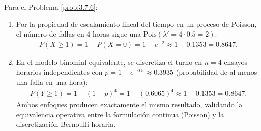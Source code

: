 \begin{solucion}
	\label{sol:3.7.6}
	Para el Problema \ref{prob:3.7.6}:
	\begin{enumerate}
		\item Por la propiedad de escalamiento lineal del tiempo en un proceso de Poisson, el número de fallas en $4$ horas sigue una $\text{Pois}(\lambda' = 4 \cdot 0.5 = 2)$:
		\begin{align*}
			P(X \ge 1) = 1 - P(X = 0) = 1 - e^{-2} \approx 1 - 0.1353 = 0.8647.
		\end{align*}
		\item En el modelo binomial equivalente, se discretiza el turno en $n = 4$ ensayos horarios independientes con $p = 1 - e^{-0.5} \approx 0.3935$ (probabilidad de al menos una falla en una hora):
		\begin{align*}
			P(Y \ge 1) = 1 - (1-p)^{4} = 1 - (0.6065)^{4} \approx 1 - 0.1353 = 0.8647.
		\end{align*}
		Ambos enfoques producen exactamente el mismo resultado, validando la equivalencia operativa entre la formulación continua (Poisson) y la discretización Bernoulli horaria.
	\end{enumerate}
\end{solucion}

